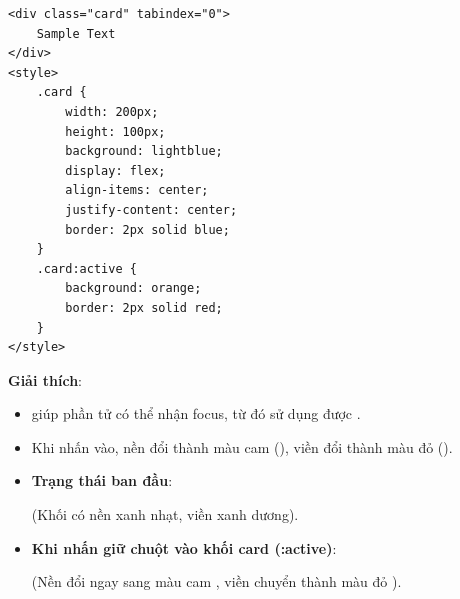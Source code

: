\begin{conceptBox}
\begin{codeWindow}
\begin{lstlisting}[language=HTML5]
<div class="card" tabindex="0">
    Sample Text
</div>
<style>
    .card {
        width: 200px;
        height: 100px;
        background: lightblue;
        display: flex;
        align-items: center;
        justify-content: center;
        border: 2px solid blue;
    }
    .card:active {
        background: orange;
        border: 2px solid red;
    }
</style>
\end{lstlisting}
\end{codeWindow}
\textbf{Giải thích}:
\begin{itemize}[leftmargin=1.5em, itemsep=2pt, parsep=0pt]
    \item {} giúp phần tử  có thể nhận focus, từ đó sử dụng được .
    \item Khi nhấn vào, nền đổi thành màu cam (), viền đổi thành màu đỏ ().
\end{itemize}
\end{conceptBox}

\begin{browserWindow}
\sffamily\small
\begin{itemize}[leftmargin=1.5em, itemsep=3pt, parsep=0pt]
    \item \textbf{Trạng thái ban đầu}:
    \par\vspace{2pt}
    \quad (Khối  có nền xanh nhạt, viền xanh dương).
    \par\vspace{4pt}
    \item \textbf{Khi nhấn giữ chuột vào khối card (:active)}:
    \par\vspace{2pt}
    \quad (Nền đổi ngay sang màu cam , viền chuyển thành màu đỏ ).
\end{itemize}
\end{browserWindow}

